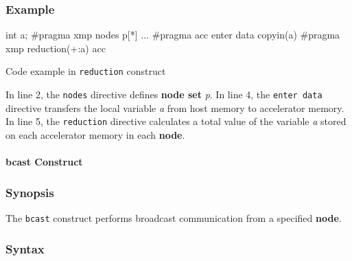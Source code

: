 \subsubsection*{Example}
\begin{myfigure}
\begin{minipage}{0.45\hsize}
\begin{center}
\end{center}
\end{minipage}
%
\begin{minipage}{0.53\hsize}
\begin{center}
\begin{XACCCexampleR}
int a;
#pragma xmp nodes p[*]
...
#pragma acc enter data copyin(a)
#pragma xmp reduction(+:a) acc
\end{XACCCexampleR}
\end{center}
\end{minipage}
\caption{Code example in {\tt reduction} construct}\label{code:reduction}
\end{myfigure}

In line 2,
the {\tt nodes} directive defines {\bf node set} {\it p}.
In line 4,
the {\tt enter data} directive transfers the local variable {\it a} from host memory to accelerator memory.
In line 5,
the {\tt reduction} directive calculates a total value of the variable {\it a} stored on each accelerator
memory in each {\bf node}.

\paragraph{bcast Construct}\label{sec:bcast}
\subsubsection*{Synopsis}
The {\tt bcast} construct performs broadcast communication from a specified {\bf node}.

\subsubsection*{Syntax}

